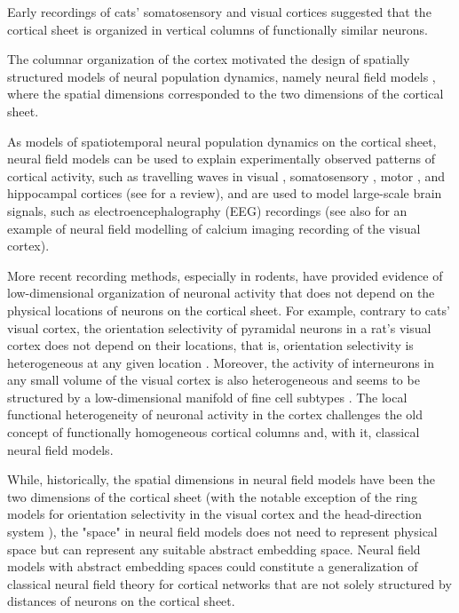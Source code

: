 \documentclass[NETN,manuscript]{stjour-new}
\begin{document}
Early recordings of cats' somatosensory \citep{Mou57} and visual \citep{HubWie62} cortices suggested that the cortical sheet is organized in vertical columns of functionally similar neurons.

The columnar organization of the cortex motivated the design of spatially structured models of neural population dynamics, namely neural field models \citep{WilCow73,Nun74,Ama77}, where the spatial dimensions corresponded to the two dimensions of the cortical sheet. 

As models of spatiotemporal neural population dynamics on the cortical sheet, neural field models can be used to explain experimentally observed patterns of cortical activity, such as travelling waves in visual \citep{SatNau12,MulRey14}, somatosensory \citep{PetHah03,FerBol06}, motor \citep{RubRob06,TakKim15}, and hippocampal \citep{LubSia09,PatFuj12,PatSch13} cortices (see \citep{MulCha18} for a review), and are used to model large-scale brain signals, such as electroencephalography (EEG) recordings \citep{Bre17} (see also \citep{DipRan18} for an example of neural field modelling of calcium imaging recording of the visual cortex).

More recent recording methods, especially in rodents, have provided evidence of low-dimensional organization of neuronal activity that does not depend on the physical locations of neurons on the cortical sheet. For example, contrary to cats' visual cortex, the orientation selectivity of pyramidal neurons in a rat's visual cortex does not depend on their locations, that is, orientation selectivity is heterogeneous at any given location \citep{OhkChu05}. Moreover, the activity of interneurons in any small volume of the visual cortex is also heterogeneous and seems to be structured by a low-dimensional manifold of fine cell subtypes \citep{BugDuf22}. The local functional heterogeneity of neuronal activity in the cortex challenges the old concept of functionally homogeneous cortical columns and, with it, classical neural field models. 

While, historically, the spatial dimensions in neural field models have been the two dimensions of the cortical sheet (with the notable exception of the ring models for orientation selectivity in the visual cortex \citep{BenBar95} and the head-direction system \citep{Zha96}), the "space" in neural field models does not need to represent physical space but can represent any suitable abstract embedding space. Neural field models with abstract embedding spaces could constitute a generalization of classical neural field theory for cortical networks that are not solely structured by distances of neurons on the cortical sheet.
\end{document}
